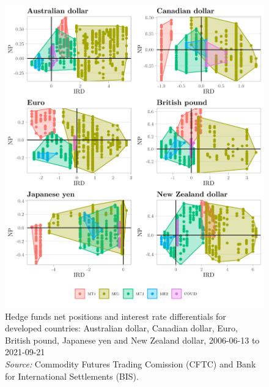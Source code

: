 \documentclass[a4paper, twoside]{templates/ociamthesis}
\begin{document}
\begin{figure}[!ht]

{\centering \includegraphics[width=0.99\columnwidth]{figure/OTHERCUR1_HF} 

}

\caption[Australian dollar, Canadian dollar, Euro, British pound, Japanese yen and New Zealand dollar, 2006-06-13 to 2021-09-21]{Hedge funds net positions and interest rate differentials for developed countries: Australian dollar, Canadian dollar, Euro, British pound, Japanese yen and New Zealand dollar, 2006-06-13 to 2021-09-21 \\ \scriptsize \textit{Source:} Commodity Futures Trading Comission (CFTC) and Bank for International Settlements (BIS).}\label{fig:FigureA38}
\end{figure}

\clearpage
\end{document}
